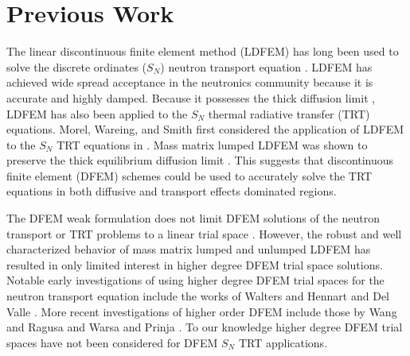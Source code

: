 \documentclass[final,3p,times]{elsarticle}
\begin{document}
\section{Previous Work} 

The linear discontinuous finite element method (LDFEM) has long been used to solve the discrete ordinates ($S_N$) neutron transport equation \cite{reed}.  
LDFEM has achieved wide spread acceptance in the neutronics community because it is accurate \cite{larsen_nelson} and highly damped.  
Because it possesses the thick diffusion limit \cite{larsen_morel_asymptotics}, LDFEM has also been applied to the $S_N$ thermal radiative transfer (TRT) equations.  
Morel, Wareing, and Smith first considered the application of LDFEM to the $S_N$ TRT equations in \cite{morel_radtran}.
Mass matrix lumped LDFEM was shown to preserve the thick equilibrium diffusion limit \cite{morel_radtran}.  
This suggests that discontinuous finite element (DFEM) schemes could be used to accurately solve the TRT equations in both diffusive and transport effects dominated regions.

The DFEM weak formulation does not limit DFEM solutions of the neutron transport or TRT problems to a linear trial space \cite{reed}.
However, the robust and well characterized behavior of mass matrix lumped and unlumped LDFEM has resulted in only limited interest in higher degree DFEM trial space solutions.
Notable early investigations of using higher degree DFEM trial spaces for the neutron transport equation include the works of Walters \cite{walters} and Hennart and  Del Valle \cite{hennart_delvalle_2,hennart_delvalle_3}.
More recent investigations of higher order DFEM include those by Wang and Ragusa \cite{yaqi_ragusa} and Warsa and Prinja \cite{warsa_prinja}.  
To our knowledge higher degree DFEM trial spaces have not been considered for DFEM $S_N$ TRT applications.
\end{document}
